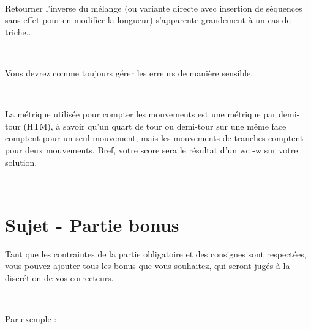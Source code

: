 \documentclass{42}
\begin{document}
\

Retourner l'inverse du m\'elange (ou variante directe avec insertion de s\'equences sans effet pour en modifier la longueur) s'apparente grandement \`a un cas de triche...

\

Vous devrez comme toujours g\'erer les erreurs de mani\`ere sensible.

\

La m\'etrique utilis\'ee pour compter les mouvements est une m\'etrique par demi-tour (HTM), \`a savoir qu'un quart de tour ou demi-tour sur une m\^eme face comptent pour un seul mouvement, mais les mouvements de tranches comptent pour deux mouvements. Bref, votre score sera le r\'esultat d'un wc -w sur votre solution.

\


\newpage


%
%


\chapter{Sujet - Partie bonus}

Tant que les contraintes de la partie obligatoire et des consignes sont respect\'ees, vous pouvez ajouter tous les bonus que vous souhaitez, qui seront jug\'es \`a la discr\'etion de vos correcteurs.

\

Par exemple :
\end{document}
